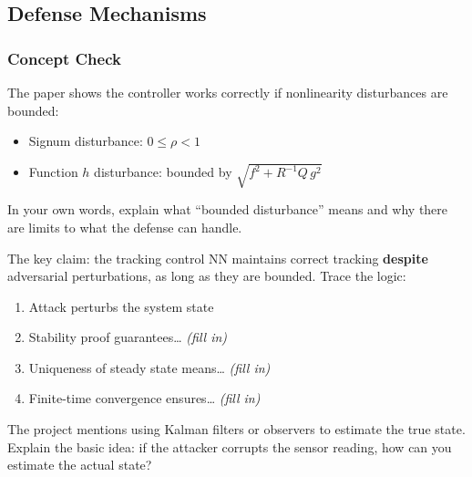 \begin{answerbox}\end{answerbox}

\subsection{Defense Mechanisms}

\subsubsection*{Concept Check}

The paper shows the controller works correctly if nonlinearity disturbances are bounded:
\begin{itemize}[nosep]
  \item Signum disturbance: $0 \leq \rho < 1$
  \item Function $h$ disturbance: bounded by $\sqrt{f^2 + R^{-1}Q\,g^2}$
\end{itemize}
In your own words, explain what ``bounded disturbance'' means and why there are limits to what the defense can handle.

\begin{answerbox}\end{answerbox}

The key claim: the tracking control NN maintains correct tracking \textbf{despite} adversarial perturbations, as long as they are bounded. Trace the logic:
\begin{enumerate}[nosep]
  \item Attack perturbs the system state
  \item Stability proof guarantees\ldots{} \emph{(fill in)}
  \item Uniqueness of steady state means\ldots{} \emph{(fill in)}
  \item Finite-time convergence ensures\ldots{} \emph{(fill in)}
\end{enumerate}

\begin{answerbox}\end{answerbox}

The project mentions using Kalman filters or observers to estimate the true state. Explain the basic idea: if the attacker corrupts the sensor reading, how can you estimate the actual state?


